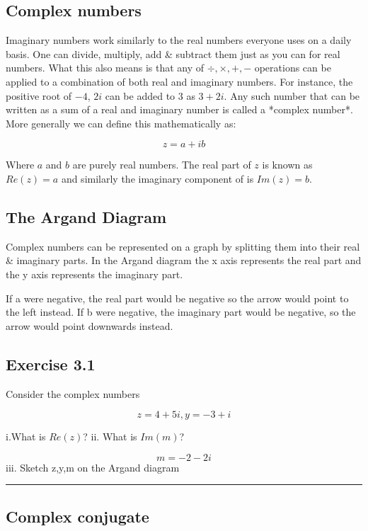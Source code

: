 \documentclass{book}
\begin{document}
\subsection{ Complex numbers}

Imaginary numbers work similarly to the real numbers everyone uses on a  daily basis. One can divide, multiply, add \& subtract them just as you can for real numbers. What this also means is that any of $ \div ,\times, +, - $ operations can be applied to a combination of both real and imaginary numbers. For instance, the positive root of $-4$, $2i$ can be added to $3$ as $3 + 2i $. Any such number that can be written as a sum of a real and imaginary number is called a *complex number*. More generally we can define this mathematically as:

$$ z = a + ib $$

Where $a$ and $b$ are purely real numbers. The real part of $z$ is known as $ Re(z) = a$ and similarly the imaginary component of is $ Im(z) = b$. 

\subsection{ The Argand Diagram}

Complex numbers can be represented on a graph by splitting them into their real \& imaginary parts. In the Argand diagram the x axis represents the real part and the y axis represents the imaginary part. 



If a were negative, the real part would be negative so the arrow would point to the left instead. If b were negative, the imaginary part would be negative, so the arrow would point downwards instead. 


\subsection{Exercise 3.1}

Consider the complex numbers 

$$ z = 4 + 5i , y = -3 + i $$

i.What is $Re(z)$? 
ii. What is $Im(m)$? 


$$m = -2 - 2i $$ 
iii. Sketch z,y,m on the Argand diagram \hrule

\subsection{ Complex conjugate}
\end{document}

